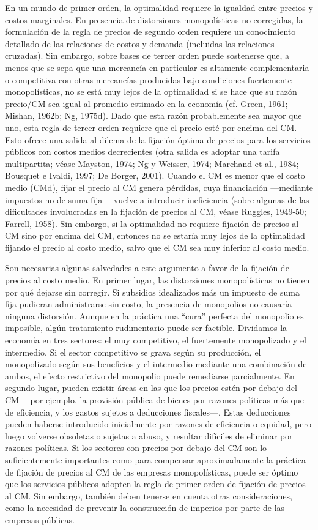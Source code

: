 \documentclass[10pt,a4paper]{article}
\begin{document}
En un mundo de primer orden, la optimalidad requiere la igualdad entre precios y costos marginales. En presencia de distorsiones monopolísticas no corregidas, la formulación de la regla de precios de segundo orden requiere un conocimiento detallado de las relaciones de costos y demanda (incluidas las relaciones cruzadas). Sin embargo, sobre bases de tercer orden puede sostenerse que, a menos que se sepa que una mercancía en particular es altamente complementaria o competitiva con otras mercancías producidas bajo condiciones fuertemente monopolísticas, no se está muy lejos de la optimalidad si se hace que su razón precio/CM sea igual al promedio estimado en la economía (cf. Green, 1961; Mishan, 1962b; Ng, 1975d). Dado que esta razón probablemente sea mayor que uno, esta regla de tercer orden requiere que el precio esté por encima del CM. Esto ofrece una salida al dilema de la fijación óptima de precios para los servicios públicos con costos medios decrecientes (otra salida es adoptar una tarifa multipartita; véase Mayston, 1974; Ng y Weisser, 1974; Marchand et al., 1984; Bousquet e Ivaldi, 1997; De Borger, 2001). Cuando el CM es menor que el costo medio (CMd), fijar el precio al CM genera pérdidas, cuya financiación —mediante impuestos no de suma fija— vuelve a introducir ineficiencia (sobre algunas de las dificultades involucradas en la fijación de precios al CM, véase Ruggles, 1949-50; Farrell, 1958). Sin embargo, si la optimalidad no requiere fijación de precios al CM sino por encima del CM, entonces no se estaría muy lejos de la optimalidad fijando el precio al costo medio, salvo que el CM sea muy inferior al costo medio.

Son necesarias algunas salvedades a este argumento a favor de la fijación de precios al costo medio. En primer lugar, las distorsiones monopolísticas no tienen por qué dejarse sin corregir. Si subsidios idealizados más un impuesto de suma fija pudieran administrarse sin costo, la presencia de monopolios no causaría ninguna distorsión. Aunque en la práctica una “cura” perfecta del monopolio es imposible, algún tratamiento rudimentario puede ser factible. Dividamos la economía en tres sectores: el muy competitivo, el fuertemente monopolizado y el intermedio. Si el sector competitivo se grava según su producción, el monopolizado según sus beneficios y el intermedio mediante una combinación de ambos, el efecto restrictivo del monopolio puede remediarse parcialmente. En segundo lugar, pueden existir áreas en las que los precios estén por debajo del CM —por ejemplo, la provisión pública de bienes por razones políticas más que de eficiencia, y los gastos sujetos a deducciones fiscales—. Estas deducciones pueden haberse introducido inicialmente por razones de eficiencia o equidad, pero luego volverse obsoletas o sujetas a abuso, y resultar difíciles de eliminar por razones políticas. Si los sectores con precios por debajo del CM son lo suficientemente importantes como para compensar aproximadamente la práctica de fijación de precios al CM de las empresas monopolísticas, puede ser óptimo que los servicios públicos adopten la regla de primer orden de fijación de precios al CM. Sin embargo, también deben tenerse en cuenta otras consideraciones, como la necesidad de prevenir la construcción de imperios por parte de las empresas públicas.
\end{document}
